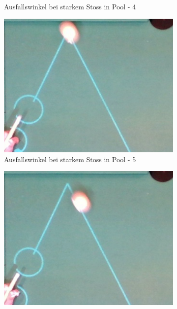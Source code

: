 \begin{figure}[h!]
\begin{subfigure}[b]{0.2\textwidth}
        \caption{Ausfallswinkel bei starkem Stoss in Pool - 4}
        \label{fig:rebound_angle_fast_pool_4}
    \end{subfigure}
    \hfill
    \begin{subfigure}[b]{0.2\textwidth}
        \centering
        \includegraphics[width=1.0\linewidth]{../common/04_results/resources/simulation/rebound_angle_fast_pool/00_rail_rebound_angle_fast_pool_05.png}
        \caption{Ausfallswinkel bei starkem Stoss in Pool - 5}
        \label{fig:rebound_angle_fast_pool_5}
    \end{subfigure}
    \hfill
    \begin{subfigure}[b]{0.2\textwidth}
        \centering
        \includegraphics[width=1.0\linewidth]{../common/04_results/resources/simulation/rebound_angle_fast_pool/00_rail_rebound_angle_fast_pool_06.png}

\end{subfigure}
\end{figure}
